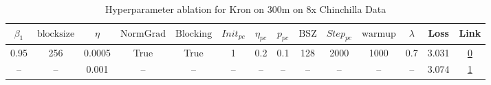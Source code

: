\begin{table}[H]
\centering
\caption{Hyperparameter ablation for Kron on 300m on 8x Chinchilla Data}
\label{tab:ablation_kron_300m_8}
\begin{tabular}{cccccccccccccc}
\toprule
$\beta_1$ & $\mathrm{block size}$ & $\eta$ & $\mathrm{NormGrad}$ & $\mathrm{Blocking}$ & $Init_{pc}$ & $\eta_{pc}$ & $p_{pc}$ & $\mathrm{BSZ}$ & $Step_{pc}$ & $\mathrm{warmup}$ & $\lambda$ & Loss & Link \\
\midrule
0.95 & 256 & 0.0005 & True & True & 1 & 0.2 & 0.1 & 128 & 2000 & 1000 & 0.7 & 3.031 & \href{https://wandb.ai/stanford-mercury/optimizer-scaling/runs/sweep-300m-48B-kronabb76feelr0.0005-wd0.7-b10.95-plr0.2-pis1-gn1-0ed5c4}{0} \\
\midrule
-- & -- & 0.001 & -- & -- & -- & -- & -- & -- & -- & -- & -- & 3.074 & \href{https://wandb.ai/stanford-mercury/optimizer-scaling/runs/sweep-300m-48B-kronk1aa5b2lr0.001-wd0.7-b10.95-plr0.2-pis1-gn1-n-e34850}{1} \\
\bottomrule
\end{tabular}
\end{table}

